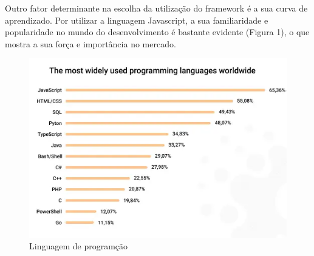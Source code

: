 Outro fator determinante na escolha da utilização do framework é a sua curva de aprendizado. Por utilizar a linguagem Javascript, a sua familiaridade e popularidade 
no mundo do desenvolvimento é bastante evidente (Figura 1), o que mostra a sua força e importância no mercado.

\begin{figure}[htb]
	\caption{\label{fig:Fig_1}Linguagem de programção}
	\begin{center}
		\includegraphics{images/top.png}
	\end{center}
\end{figure}
